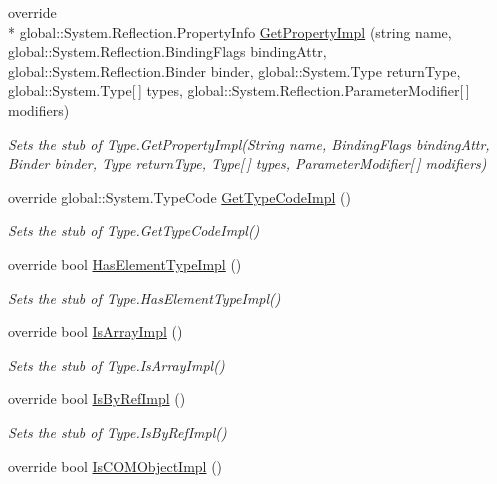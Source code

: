 \begin{DoxyCompactItemize}
override \\*
global\-::\-System.\-Reflection.\-Property\-Info \hyperlink{class_system_1_1_fakes_1_1_stub_type_ad294d57c26a78a06eeb9495aa0fc10cd}{Get\-Property\-Impl} (string name, global\-::\-System.\-Reflection.\-Binding\-Flags binding\-Attr, global\-::\-System.\-Reflection.\-Binder binder, global\-::\-System.\-Type return\-Type, global\-::\-System.\-Type\mbox{[}$\,$\mbox{]} types, global\-::\-System.\-Reflection.\-Parameter\-Modifier\mbox{[}$\,$\mbox{]} modifiers)
\begin{DoxyCompactList}\small\item\em Sets the stub of Type.\-Get\-Property\-Impl(\-String name, Binding\-Flags binding\-Attr, Binder binder, Type return\-Type, Type\mbox{[}$\,$\mbox{]} types, Parameter\-Modifier\mbox{[}$\,$\mbox{]} modifiers)\end{DoxyCompactList}\item 
override global\-::\-System.\-Type\-Code \hyperlink{class_system_1_1_fakes_1_1_stub_type_a77a1f3fd28edcdee16a6aa03a296ea21}{Get\-Type\-Code\-Impl} ()
\begin{DoxyCompactList}\small\item\em Sets the stub of Type.\-Get\-Type\-Code\-Impl()\end{DoxyCompactList}\item 
override bool \hyperlink{class_system_1_1_fakes_1_1_stub_type_a01bbb38a9d461083a5ffb73af2e17b25}{Has\-Element\-Type\-Impl} ()
\begin{DoxyCompactList}\small\item\em Sets the stub of Type.\-Has\-Element\-Type\-Impl()\end{DoxyCompactList}\item 
override bool \hyperlink{class_system_1_1_fakes_1_1_stub_type_a92a9cf1d8d1ea5d34b194ab418c03b86}{Is\-Array\-Impl} ()
\begin{DoxyCompactList}\small\item\em Sets the stub of Type.\-Is\-Array\-Impl()\end{DoxyCompactList}\item 
override bool \hyperlink{class_system_1_1_fakes_1_1_stub_type_ada37cd57cbfa6cd4c65a3c4a101a8261}{Is\-By\-Ref\-Impl} ()
\begin{DoxyCompactList}\small\item\em Sets the stub of Type.\-Is\-By\-Ref\-Impl()\end{DoxyCompactList}\item 
override bool \hyperlink{class_system_1_1_fakes_1_1_stub_type_a29825b5e3ba69763f6e4209acc9f230b}{Is\-C\-O\-M\-Object\-Impl} ()

\end{DoxyCompactItemize}
